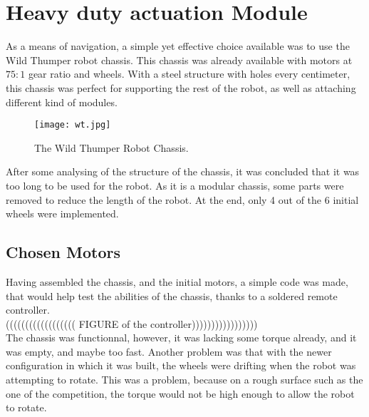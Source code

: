 %
%   
%

\chapter{Heavy duty actuation Module}

As a means of navigation, a simple yet effective choice available was to use the Wild Thumper robot chassis. This chassis was already available with motors at $75:1$ gear ratio and wheels. With a steel structure with holes every centimeter, this chassis was perfect for supporting the rest of the robot, as well as attaching different kind of modules.

\begin{figure}[H]
  \centering
  \texttt{[image: wt.jpg]}
  \caption{The Wild Thumper Robot Chassis.}
\label{fig:wt}
\end{figure}

After some analysing of the structure of the chassis, it was concluded that it was too long to be used for the robot. As it is a modular chassis, some parts were removed to reduce the length of the robot. At the end, only 4 out of the 6 initial wheels were implemented.

\section{Chosen Motors}

Having assembled the chassis, and the initial motors, a simple code was made, that would help test the abilities of the chassis, thanks to a soldered remote controller.\\

(((((((((((((((((( FIGURE of the controller)))))))))))))))))\\

The chassis was functionnal, however, it was lacking some torque already, and it was empty, and maybe too fast. Another problem was that with the newer configuration in which it was built, the wheels were drifting when the robot was attempting to rotate. This was a problem, because on a rough surface such as the one of the competition, the torque would not be high enough to allow the robot to rotate.\\

